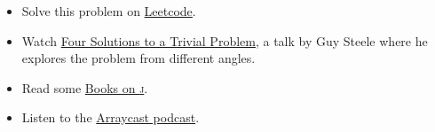 \documentclass{article}
\begin{document}
\begin{itemize}
  \item Solve this problem on \href{https://leetcode.com/problems/trapping-rain-water/}{Leetcode}.
  \item Watch \href{https://youtu.be/ftcIcn8AmSY}{Four Solutions to a Trivial Problem}, a talk by Guy Steele where he explores the problem from different angles.
  \item Read some \href{https://code.jsoftware.com/wiki/Books}{Books on \textsc{j}}.
  \item Listen to the \href{https://arraycast.com/}{Arraycast podcast}.
\end{itemize}
\end{document}
